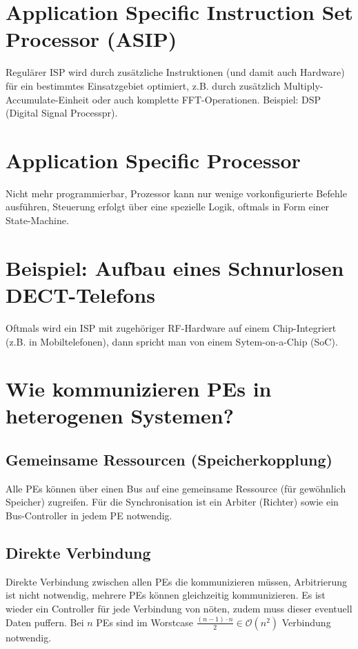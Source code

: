 \section{Application Specific Instruction Set Processor (ASIP)}
Regulärer ISP wird durch zusätzliche Instruktionen (und damit auch Hardware) für ein bestimmtes Einsatzgebiet optimiert, 
z.B. durch zusätzlich \glqq{}Multiply-Accumulate\grqq{}-Einheit oder auch komplette FFT-Operationen.
Beispiel: DSP (Digital Signal Processpr).

\section{Application Specific Processor}
Nicht mehr programmierbar, Prozessor kann nur wenige vorkonfigurierte Befehle ausführen, Steuerung erfolgt über eine spezielle Logik, oftmals in Form einer
State-Machine.

\section{Beispiel: Aufbau eines Schnurlosen DECT-Telefons}
Oftmals wird ein ISP mit zugehöriger RF-Hardware auf einem Chip-Integriert (z.B. in Mobiltelefonen), dann spricht man von einem Sytem-on-a-Chip (SoC).

\section{Wie kommunizieren PEs in heterogenen Systemen?}
\subsection{Gemeinsame Ressourcen (Speicherkopplung)}
Alle PEs können über einen Bus auf eine gemeinsame Ressource (für gewöhnlich Speicher) zugreifen. 
Für die Synchronisation ist ein \glqq{}Arbiter\grqq{} (Richter) sowie ein Bus-Controller in jedem PE notwendig.

\subsection{Direkte Verbindung}
Direkte Verbindung zwischen allen PEs die kommunizieren müssen, Arbitrierung ist nicht notwendig, mehrere PEs können gleichzeitig kommunizieren. 
Es ist wieder ein Controller für jede Verbindung von nöten, zudem muss dieser eventuell Daten puffern. 
Bei $n$ PEs sind im Worstcase $\frac{(n-1)\cdot n}{2} \in  \mathcal{O}(n^2)$ Verbindung notwendig.
